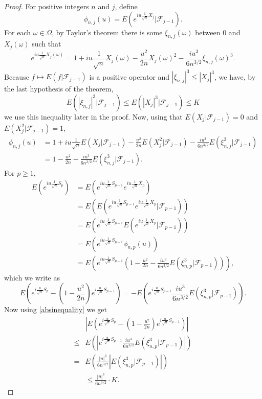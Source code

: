\documentclass{article}
\theoremstyle{definition}
\begin{document}
\begin{proof}
For positive integers $n$ and $j$, define
\[
\phi_{n,j}(u) = E(e^{iu\frac{1}{\sqrt{n}}X_j} | \mathscr{F}_{j-1}).
\]
For each $\omega \in \Omega$, by Taylor's theorem there is some $\xi_{n,j}(\omega)$  between $0$ and $X_j(\omega)$ such
that
\[
e^{iu\frac{1}{\sqrt{n}}X_j(\omega)}  = 1 + iu\frac{1}{\sqrt{n}}X_j(\omega) - \frac{u^2}{2n} X_j(\omega)^2
-\frac{iu^3}{6n^{3/2}} \xi_{n,j}(\omega)^3.
\]
Because $f \mapsto E(f|\mathscr{F}_{j-1})$ is a positive operator and
$|\xi_{n,j}|^3 \leq |X_j|^3$, we have, by the last hypothesis of the theorem,
\begin{equation}
E(|\xi_{n,j}|^3 | \mathscr{F}_{j-1}) \leq E(|X_j|^3 | \mathscr{F}_{j-1}) \leq K
\label{absinequality}
\end{equation}
we use this inequality later in the proof.
Now, using that $E(X_j|\mathscr{F}_{j-1})=0$ and $E(X_j^2|\mathscr{F}_{j-1})=1$,
\begin{align*}
\phi_{n,j}(u)&=1+iu\frac{1}{\sqrt{n}} E(X_j|\mathscr{F}_{j-1})
-\frac{u^2}{2n} E(X_j^2|\mathscr{F}_{j-1})
-\frac{iu^3}{6n^{3/2}} E(\xi_{n,j}^3|\mathscr{F}_{j-1})\\
&=1-\frac{u^2}{2n} -\frac{iu^3}{6n^{3/2}} E(\xi_{n,j}^3|\mathscr{F}_{j-1}).
\end{align*}
For $p \geq 1$, 
\begin{align*}
E(e^{iu\frac{1}{\sqrt{n}} S_p})&=
E(e^{iu\frac{1}{\sqrt{n}} S_{p-1}} e^{iu\frac{1}{\sqrt{n}} X_p})\\
&=E(E(e^{iu\frac{1}{\sqrt{n}} S_{p-1}} e^{iu\frac{1}{\sqrt{n}} X_p}|\mathscr{F}_{p-1}))\\
&=E(e^{iu\frac{1}{\sqrt{n}} S_{p-1}} E( e^{iu\frac{1}{\sqrt{n}} X_p}|\mathscr{F}_{p-1}))\\
&=E(e^{iu\frac{1}{\sqrt{n}} S_{p-1}} \phi_{n,p}(u))\\
&=E\left(e^{iu\frac{1}{\sqrt{n}} S_{p-1}}
\left( 1-\frac{u^2}{2n} -\frac{iu^3}{6n^{3/2}} E\left(\xi_{n,p}^3|\mathscr{F}_{p-1}\right) \right) \right),
\end{align*}
which we write as
\[
E\left(e^{i \frac{u}{\sqrt{n}} S_p} - \left(1-\frac{u^2}{2n}\right) e^{i \frac{u}{\sqrt{n}} S_{p-1}} \right)
=-E\left(e^{i\frac{u}{\sqrt{n}} S_{p-1}} \frac{iu^3}{6n^{3/2}}E\left(\xi_{n,p}^3|\mathscr{F}_{p-1}\right) \right).
\]
Now using \eqref{absinequality} we get
\[
\begin{split}
&\left|E\left(e^{i \frac{u}{\sqrt{n}} S_p} - \left(1-\frac{u^2}{2n}\right) e^{i \frac{u}{\sqrt{n}} S_{p-1}} \right)\right|\\
\leq&E\left( \left| e^{i\frac{u}{\sqrt{n}} S_{p-1}} \frac{iu^3}{6n^{3/2}}E\left(\xi_{n,p}^3|\mathscr{F}_{p-1}\right)  \right| \right)\\
=&E\left( \frac{|u|^3}{6n^{3/2}} \left|E\left(\xi_{n,p}^3|\mathscr{F}_{p-1}\right)\right| \right)\\
&\leq \frac{|u|^3}{6n^{3/2}} \cdot K.
\end{split}
\]


\end{proof}
\end{document}

